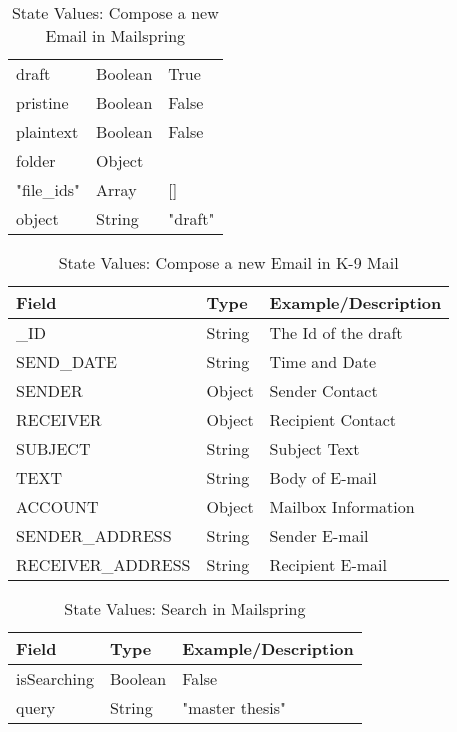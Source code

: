 \begin{table}[H]
\begin{tabular}{lll}
draft     & Boolean   & True                                                   \\
pristine  & Boolean   & False                                                  \\
plaintext & Boolean   & False                                                  \\
folder    & Object    & {}                                                     \\
"file\_ids"  & Array  & []                                                  \\
object    & String    & "draft"                                               
\end{tabular}
\caption{State Values: Compose a new Email in Mailspring}
\label{tab:compose_new_email_mailspring}
\end{table} \FloatBarrier



\FloatBarrier \begin{table}[H]
\centering
\begin{tabular}{lll}
Field     & Type      & Example/Description \\
\hline
\_ID            & String & The Id of the draft \\
SEND\_DATE      & String     &        Time and Date             \\
SENDER         &  Object    &        Sender Contact             \\
RECEIVER         &  Object    &       Recipient Contact              \\
SUBJECT        &  String    &         Subject Text            \\
TEXT        &  String    &          Body of E-mail           \\
ACCOUNT        &   Object   &           Mailbox Information          \\
SENDER\_ADDRESS &   String   &        Sender E-mail            \\
RECEIVER\_ADDRESS &   String   &      Recipient E-mail              
\end{tabular}
\caption{State Values: Compose a new Email in K-9 Mail}
\label{tab:compose_new_email_k9}
\centering
\end{table} \FloatBarrier



\FloatBarrier \begin{table}[H]
\centering
\begin{tabular}{lll}
Field       & Type    & Example/Description \\
\hline
isSearching & Boolean & False               \\
query       & String  & "master   thesis"  
\end{tabular}
\caption{State Values: Search in Mailspring}
\label{tab:search_mailspring}
\end{table} \FloatBarrier



